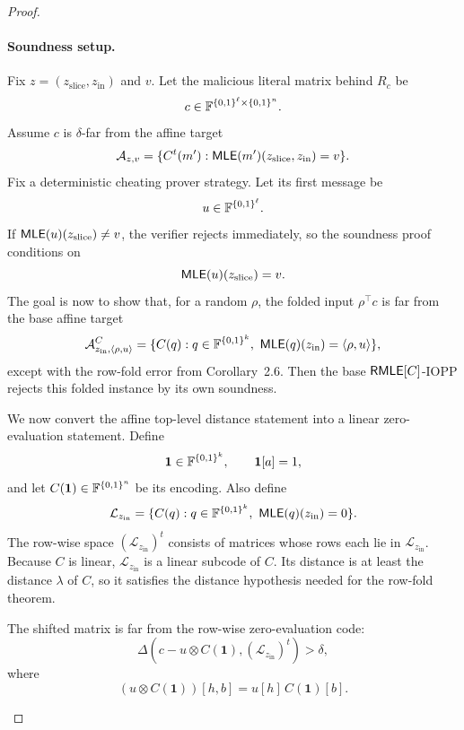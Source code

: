\begin{proof}
\paragraph{Soundness setup.}
Fix \(z=(z_{\mathrm{slice}},z_{\mathrm{in}})\) and \(v\).  Let the malicious
literal matrix behind \(R_c\) be
\[
  c\in\mathbb{F}^{\{0,1\}^\ell\times\{0,1\}^n}.
\]
Assume \(c\) is \(\delta\)-far from the affine target
\[
  \mathcal A_{z,v}
  =
  \{C^t(m'):\mathsf{MLE}(m')(z_{\mathrm{slice}},z_{\mathrm{in}})=v\}.
\]
Fix a deterministic cheating prover strategy.  Let its first message be
\[
  u\in\mathbb{F}^{\{0,1\}^\ell}.
\]
If \(\mathsf{MLE}(u)(z_{\mathrm{slice}})\ne v\), the verifier rejects immediately, so
the soundness proof conditions on
\[
  \mathsf{MLE}(u)(z_{\mathrm{slice}})=v.
\]
The goal is now to show that, for a random \(\rho\), the folded input
\(\rho^\top c\) is far from the base affine target
\[
  \mathcal A^C_{z_{\mathrm{in}},\left\langle \rho,u \right\rangle}
  =
  \{C(q):q\in\mathbb{F}^{\{0,1\}^k},\
  \mathsf{MLE}(q)(z_{\mathrm{in}})=\left\langle \rho,u \right\rangle\},
\]
except with the row-fold error from Corollary~2.6.  Then the base
\(\mathsf{RMLE}[C]\)-IOPP rejects this folded instance by its own soundness.

We now convert the affine top-level distance statement into a linear
zero-evaluation statement.  Define
\[
  \mathbf 1\in\mathbb{F}^{\{0,1\}^k},
  \qquad
  \mathbf 1[a]=1,
\]
and let \(C(\mathbf 1)\in\mathbb{F}^{\{0,1\}^n}\) be its encoding.  Also define
\[
  \mathcal L_{z_{\mathrm{in}}}
  =
  \{C(q):q\in\mathbb{F}^{\{0,1\}^k},\ \mathsf{MLE}(q)(z_{\mathrm{in}})=0\}.
\]
The row-wise space \((\mathcal L_{z_{\mathrm{in}}})^t\) consists of matrices
whose rows each lie in \(\mathcal L_{z_{\mathrm{in}}}\).
Because \(C\) is linear, \(\mathcal L_{z_{\mathrm{in}}}\) is a linear subcode
of \(C\).  Its distance is at least the distance \(\lambda\) of \(C\), so it
satisfies the distance hypothesis needed for the row-fold theorem.

\begin{claim}
\label{claim:blaze-interleaving-first-shift}
The shifted matrix is far from the row-wise zero-evaluation code:
\[
  \Delta\!\left(
    c-u\otimes C(\mathbf 1),
    (\mathcal L_{z_{\mathrm{in}}})^t
  \right)>\delta,
\]
where
\[
  (u\otimes C(\mathbf 1))[h,b]=u[h]\,C(\mathbf 1)[b].
\]
\end{claim}


\end{proof}
